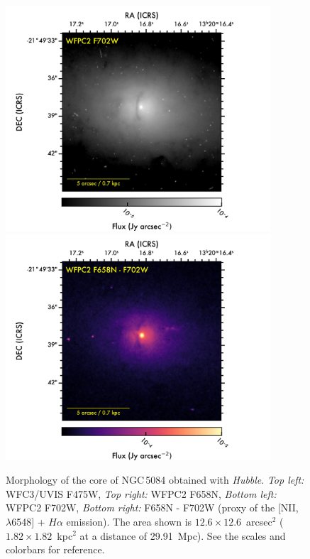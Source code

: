 \documentclass[modern]{CORE-AAS/aastex631}
\begin{document}
\begin{figure}[]
\begin{center}
\includegraphics[trim={0 0 60 57}, clip, height=8.4cm]{FIGURES/NGC5084_F702W.png}
\includegraphics[trim={140 0 60 57}, clip, height=8.4cm]{FIGURES/NGC5084_F658N_F702W.png}

\caption{Morphology of the core of NGC\,5084 obtained with \emph{Hubble}. \emph{Top left:} WFC3/UVIS F475W, \emph{Top right:} WFPC2 F658N, \emph{Bottom left:} WFPC2 F702W, \emph{Bottom right:} F658N - F702W (proxy of the [NII, $\lambda$6548] + $H\alpha$ emission). The area shown is $12.6\times12.6$~arcsec$^2$ ($1.82\times1.82$~kpc$^2$ at a distance of 29.91~Mpc). See the scales and colorbars for reference.} 
\label{fig:NGC5084_multiband}
\end{center}
\end{figure}
\end{document}
